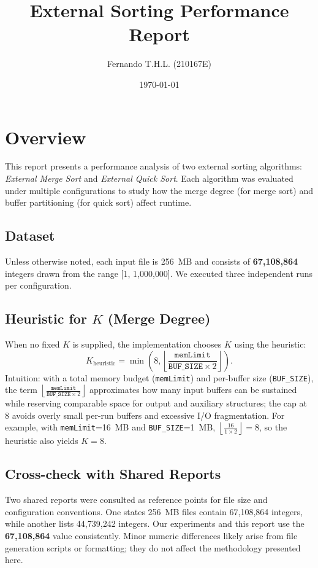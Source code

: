 \documentclass{article}
\title{External Sorting Performance Report}
\author{Fernando T.H.L. (210167E)}
\date{\today}
\begin{document}
\maketitle

\section*{Overview}
This report presents a performance analysis of two external sorting algorithms: \emph{External Merge Sort} and \emph{External Quick Sort}. Each algorithm was evaluated under multiple configurations to study how the merge degree (for merge sort) and buffer partitioning (for quick sort) affect runtime.

\subsection*{Dataset}
Unless otherwise noted, each input file is 256~MB and consists of \textbf{67{,}108{,}864} integers drawn from the range [1, 1{,}000{,}000]. We executed three independent runs per configuration.

\subsection*{Heuristic for $K$ (Merge Degree)}
When no fixed $K$ is supplied, the implementation chooses $K$ using the heuristic:
\[ K_{\text{heuristic}} = \min\!\left(8, \left\lfloor \frac{\texttt{memLimit}}{\texttt{BUF\_SIZE}\times 2} \right\rfloor \right). \]
Intuition: with a total memory budget (\texttt{memLimit}) and per-buffer size (\texttt{BUF\_SIZE}), the term $\left\lfloor \tfrac{\texttt{memLimit}}{\texttt{BUF\_SIZE}\times 2} \right\rfloor$ approximates how many input buffers can be sustained while reserving comparable space for output and auxiliary structures; the cap at $8$ avoids overly small per-run buffers and excessive I/O fragmentation. For example, with \texttt{memLimit}=16~MB and \texttt{BUF\_SIZE}=1~MB, $\left\lfloor \tfrac{16}{1\times 2} \right\rfloor = 8$, so the heuristic also yields $K=8$.

\subsection*{Cross-check with Shared Reports}
Two shared reports were consulted as reference points for file size and configuration conventions. One states 256~MB files contain 67{,}108{,}864 integers, while another lists 44{,}739{,}242 integers. Our experiments and this report use the \textbf{67{,}108{,}864} value consistently. Minor numeric differences likely arise from file generation scripts or formatting; they do not affect the methodology presented here.
\end{document}

